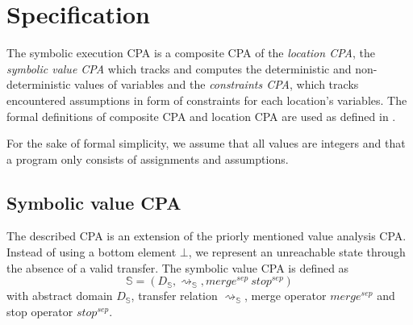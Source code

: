 \newcommand{\symex}{\mathbb{S}}

\newcommand{\constraints}{\mathbb{C}}
\newcommand{\location}{\mathbb{L}}
\newcommand{\composition}{\mathscr{C}}

\newcommand{\transfer}{\rightsquigarrow}
\newcommand{\gtransfer}{\overset{g}{\transfer}}
\newcommand{\strengthen}{\downarrow}

\newcommand{\valueset}{\mathscr{Z}}
\newcommand{\integerset}{\mathbb{Z}}

\newcommand{\symlattice}{\mathscr{E}}
\newcommand{\symidset}{S_I}
\newcommand{\symexpset}{S_E}

\newcommand{\constraintlattice}{\mathscr{C}}

\newcommand{\llbracket}{[\![}
\newcommand{\rrbracket}{]\!]}
\newcommand{\concretization}{\llbracket \cdot \rrbracket}
\newcommand{\lesserEqual}{\sqsubseteq}
\newcommand{\leastupperbound}{\sqcup}

\newcommand{\satisfies}{\vDash}

\section{Specification}
The symbolic execution CPA is a composite CPA of the \emph{location CPA}, the \emph{symbolic value CPA} which tracks and computes the deterministic and non-deterministic values of variables and the \emph{constraints CPA}, which tracks encountered assumptions in form of constraints for each location's variables. The formal definitions of composite CPA and location CPA are used as defined in \cite{Beyer2007}.

For the sake of formal simplicity, we assume that all values are integers and that a program only consists of assignments and assumptions.

\subsection{Symbolic value CPA}
The described CPA is an extension of the priorly mentioned value analysis CPA.
Instead of using a bottom element $\bot$, we represent an unreachable state through the absence of a valid transfer.
The symbolic value CPA is defined as
\[\symex = (D_\symex, \transfer_\symex, merge^{sep}\ stop^{sep})\]
with abstract domain $D_\symex$, transfer relation $\transfer_\symex$, merge operator $merge^{sep}$ and stop operator $stop^{sep}$.

